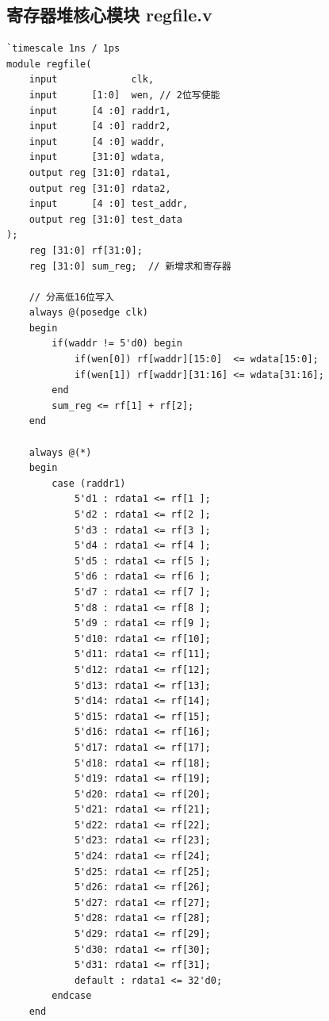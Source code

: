 \documentclass[12pt,a4paper]{article}
\begin{document}
\subsection{寄存器堆核心模块 regfile.v}
\begin{lstlisting}
`timescale 1ns / 1ps
module regfile(
    input             clk,
    input      [1:0]  wen, // 2位写使能
    input      [4 :0] raddr1,
    input      [4 :0] raddr2,
    input      [4 :0] waddr,
    input      [31:0] wdata,
    output reg [31:0] rdata1,
    output reg [31:0] rdata2,
    input      [4 :0] test_addr,
    output reg [31:0] test_data
);
    reg [31:0] rf[31:0];
    reg [31:0] sum_reg;  // 新增求和寄存器

    // 分高低16位写入
    always @(posedge clk)
    begin
        if(waddr != 5'd0) begin
            if(wen[0]) rf[waddr][15:0]  <= wdata[15:0];
            if(wen[1]) rf[waddr][31:16] <= wdata[31:16];
        end
        sum_reg <= rf[1] + rf[2];
    end

    always @(*)
    begin
        case (raddr1)
            5'd1 : rdata1 <= rf[1 ];
            5'd2 : rdata1 <= rf[2 ];
            5'd3 : rdata1 <= rf[3 ];
            5'd4 : rdata1 <= rf[4 ];
            5'd5 : rdata1 <= rf[5 ];
            5'd6 : rdata1 <= rf[6 ];
            5'd7 : rdata1 <= rf[7 ];
            5'd8 : rdata1 <= rf[8 ];
            5'd9 : rdata1 <= rf[9 ];
            5'd10: rdata1 <= rf[10];
            5'd11: rdata1 <= rf[11];
            5'd12: rdata1 <= rf[12];
            5'd13: rdata1 <= rf[13];
            5'd14: rdata1 <= rf[14];
            5'd15: rdata1 <= rf[15];
            5'd16: rdata1 <= rf[16];
            5'd17: rdata1 <= rf[17];
            5'd18: rdata1 <= rf[18];
            5'd19: rdata1 <= rf[19];
            5'd20: rdata1 <= rf[20];
            5'd21: rdata1 <= rf[21];
            5'd22: rdata1 <= rf[22];
            5'd23: rdata1 <= rf[23];
            5'd24: rdata1 <= rf[24];
            5'd25: rdata1 <= rf[25];
            5'd26: rdata1 <= rf[26];
            5'd27: rdata1 <= rf[27];
            5'd28: rdata1 <= rf[28];
            5'd29: rdata1 <= rf[29];
            5'd30: rdata1 <= rf[30];
            5'd31: rdata1 <= rf[31];
            default : rdata1 <= 32'd0;
        endcase
    end


\end{lstlisting}
\end{document}
